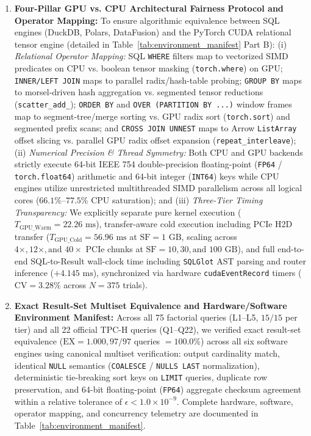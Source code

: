 \documentclass[10pt,a4paper]{article}
\begin{document}
\begin{enumerate}[leftmargin=1.5em,itemsep=2pt]
    \item \textbf{Four-Pillar GPU vs. CPU Architectural Fairness Protocol and Operator Mapping:} To ensure algorithmic equivalence between SQL engines (DuckDB, Polars, DataFusion) and the PyTorch CUDA relational tensor engine (detailed in Table~\ref{tab:environment_manifest} Part B): (i) \emph{Relational Operator Mapping:} SQL \texttt{WHERE} filters map to vectorized SIMD predicates on CPU vs. boolean tensor masking (\texttt{torch.where}) on GPU; \texttt{INNER/LEFT JOIN} maps to parallel radix/hash-table probing; \texttt{GROUP BY} maps to morsel-driven hash aggregation vs. segmented tensor reductions (\texttt{scatter\_add\_}); \texttt{ORDER BY} and \texttt{OVER (PARTITION BY ...)} window frames map to segment-tree/merge sorting vs. GPU radix sort (\texttt{torch.sort}) and segmented prefix scans; and \texttt{CROSS JOIN UNNEST} maps to Arrow \texttt{ListArray} offset slicing vs. parallel GPU radix offset expansion (\texttt{repeat\_interleave}); (ii) \emph{Numerical Precision \& Thread Symmetry:} Both CPU and GPU backends strictly execute 64-bit IEEE 754 double-precision floating-point (\texttt{FP64} / \texttt{torch.float64}) arithmetic and 64-bit integer (\texttt{INT64}) keys while CPU engines utilize unrestricted multithreaded SIMD parallelism across all logical cores ($66.1\%\text{--}77.5\%$ CPU saturation); and (iii) \emph{Three-Tier Timing Transparency:} We explicitly separate pure kernel execution ($T_{\text{GPU\_Warm}} = 22.26\text{ ms}$), transfer-aware cold execution including PCIe H2D transfer ($T_{\text{GPU\_Cold}} = 56.96\text{ ms}$ at $\text{SF}=1\text{ GB}$, scaling across $4\times, 12\times, \text{and } 40\times$ PCIe chunks at $\text{SF}=10, 30, \text{and } 100\text{ GB}$), and full end-to-end SQL-to-Result wall-clock time including \texttt{SQLGlot} AST parsing and router inference ($+4.145\text{ ms}$), synchronized via hardware \texttt{cudaEventRecord} timers ($\text{CV} = \mathbf{3.28\%}$ across $N=375$ trials).
    \item \textbf{Exact Result-Set Multiset Equivalence and Hardware/Software Environment Manifest:} Across all 75 factorial queries (L1--L5, $15/15$ per tier) and all 22 official TPC-H queries (Q1--Q22), we verified exact result-set equivalence ($\text{EX}=1.000, 97/97$ queries $= 100.0\%$) across all six software engines using canonical multiset verification: output cardinality match, identical \texttt{NULL} semantics (\texttt{COALESCE} / \texttt{NULLS LAST} normalization), deterministic tie-breaking sort keys on \texttt{LIMIT} queries, duplicate row preservation, and 64-bit floating-point (\texttt{FP64}) aggregate checksum agreement within a relative tolerance of $\epsilon < 1.0 \times 10^{-9}$. Complete hardware, software, operator mapping, and concurrency telemetry are documented in Table~\ref{tab:environment_manifest}.
\end{enumerate}
\end{document}
